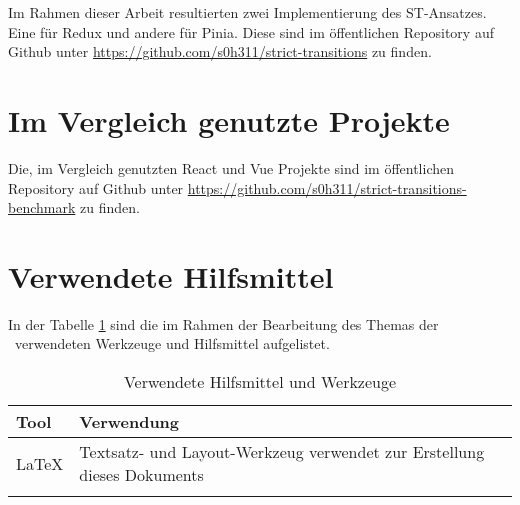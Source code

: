 Im Rahmen dieser Arbeit resultierten zwei Implementierung des ST-Ansatzes. Eine für Redux und andere für Pinia. Diese sind im öffentlichen Repository auf Github unter \url{https://github.com/s0h311/strict-transitions} zu finden.

\section{Im Vergleich genutzte Projekte} \label{ap:githubRepository}

Die, im Vergleich genutzten React und Vue Projekte sind im öffentlichen Repository auf Github unter \url{https://github.com/s0h311/strict-transitions-benchmark} zu finden.

\section{Verwendete Hilfsmittel}
In der Tabelle \ref{tab:tooling} sind die im Rahmen der Bearbeitung des Themas der \IthesisKindDE~verwendeten Werkzeuge und Hilfsmittel aufgelistet.

\begin{table}[h!]
\caption{Verwendete Hilfsmittel und Werkzeuge}
\begin{tabular}{|l|l|}
\hline 
\rowcolor{lightgray} Tool & Verwendung \\
\hline
\LaTeX & Textsatz- und Layout-Werkzeug verwendet zur Erstellung dieses Dokuments \\
\hline
 & \\
\hline
\end{tabular}
\label{tab:tooling}
\end{table}

